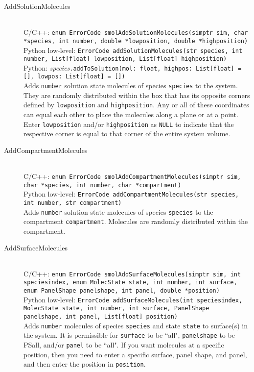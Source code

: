 \documentclass {book}
\newcommand {\ttt} {\texttt}
\begin{document}
\begin{description}
\item[AddSolutionMolecules]
\hfill \\
C/C++: \ttt{enum ErrorCode smolAddSolutionMolecules(simptr sim, char *species, int number, double *lowposition, double *highposition)}\\
Python low-level: \ttt{ErrorCode addSolutionMolecules(str species, int number, List[float] lowposition, List[float] highposition)}\\
Python: \textit{species}\ttt{.addToSolution(mol: float, highpos: List[float] = [], lowpos: List[float] = [])}\\
Adds \ttt{number} solution state molecules of species \ttt{species} to the system. They are randomly distributed within the box that has its opposite corners defined by \ttt{lowposition} and \ttt{highposition}. Any or all of these coordinates can equal each other to place the molecules along a plane or at a point. Enter \ttt{lowposition} and/or \ttt{highposition} as \ttt{NULL} to indicate that the respective corner is equal to that corner of the entire system volume.

\item[AddCompartmentMolecules]
\hfill \\
C/C++: \ttt{enum ErrorCode smolAddCompartmentMolecules(simptr sim, char *species, int number, char *compartment)}\\
Python low-level: \ttt{ErrorCode addCompartmentMolecules(str species, int number, str compartment)}\\
Adds \ttt{number} solution state molecules of species \ttt{species} to the compartment \ttt{compartment}. Molecules are randomly distributed within the compartment.

\item[AddSurfaceMolecules]
\hfill \\
C/C++: \ttt{enum ErrorCode smolAddSurfaceMolecules(simptr sim, int speciesindex, enum MolecState state, int number, int surface, enum PanelShape panelshape, int panel, double *position)}\\
Python low-level: \ttt{ErrorCode addSurfaceMolecules(int speciesindex, MolecState state, int number, int surface, PanelShape panelshape, int panel, List[float] position)}\\
Adds \ttt{number} molecules of species \ttt{species} and state \ttt{state} to surface(s) in the system. It is permissible for \ttt{surface} to be ``all", \ttt{panelshape} to be PSall, and/or \ttt{panel} to be ``all". If you want molecules at a specific position, then you need to enter a specific surface, panel shape, and panel, and then enter the position in \ttt{position}.


\end{description}
\end{document}
